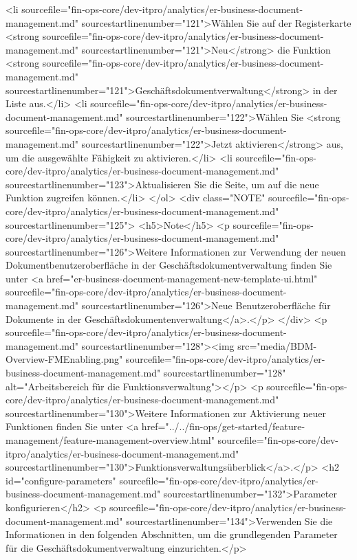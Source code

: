 <li sourcefile="fin-ops-core/dev-itpro/analytics/er-business-document-management.md" sourcestartlinenumber="121">Wählen Sie auf der Registerkarte <strong sourcefile="fin-ops-core/dev-itpro/analytics/er-business-document-management.md" sourcestartlinenumber="121">Neu</strong> die Funktion <strong sourcefile="fin-ops-core/dev-itpro/analytics/er-business-document-management.md" sourcestartlinenumber="121">Geschäftsdokumentverwaltung</strong> in der Liste aus.</li>
<li sourcefile="fin-ops-core/dev-itpro/analytics/er-business-document-management.md" sourcestartlinenumber="122">Wählen Sie <strong sourcefile="fin-ops-core/dev-itpro/analytics/er-business-document-management.md" sourcestartlinenumber="122">Jetzt aktivieren</strong> aus, um die ausgewählte Fähigkeit zu aktivieren.</li>
<li sourcefile="fin-ops-core/dev-itpro/analytics/er-business-document-management.md" sourcestartlinenumber="123">Aktualisieren Sie die Seite, um auf die neue Funktion zugreifen können.</li>
</ol>
<div class="NOTE" sourcefile="fin-ops-core/dev-itpro/analytics/er-business-document-management.md" sourcestartlinenumber="125">
<h5>Note</h5>
<p sourcefile="fin-ops-core/dev-itpro/analytics/er-business-document-management.md" sourcestartlinenumber="126">Weitere Informationen zur Verwendung der neuen Dokumentbenutzeroberfläche in der Geschäftsdokumentverwaltung finden Sie unter <a href="er-business-document-management-new-template-ui.html" sourcefile="fin-ops-core/dev-itpro/analytics/er-business-document-management.md" sourcestartlinenumber="126">Neue Benutzeroberfläche für Dokumente in der Geschäftsdokumentenverwaltung</a>.</p>
</div>
<p sourcefile="fin-ops-core/dev-itpro/analytics/er-business-document-management.md" sourcestartlinenumber="128"><img src="media/BDM-Overview-FMEnabling.png" sourcefile="fin-ops-core/dev-itpro/analytics/er-business-document-management.md" sourcestartlinenumber="128" alt="Arbeitsbereich für die Funktionsverwaltung"></p>
<p sourcefile="fin-ops-core/dev-itpro/analytics/er-business-document-management.md" sourcestartlinenumber="130">Weitere Informationen zur Aktivierung neuer Funktionen finden Sie unter <a href="../../fin-ops/get-started/feature-management/feature-management-overview.html" sourcefile="fin-ops-core/dev-itpro/analytics/er-business-document-management.md" sourcestartlinenumber="130">Funktionsverwaltungsüberblick</a>.</p>
<h2 id="configure-parameters" sourcefile="fin-ops-core/dev-itpro/analytics/er-business-document-management.md" sourcestartlinenumber="132">Parameter konfigurieren</h2>
<p sourcefile="fin-ops-core/dev-itpro/analytics/er-business-document-management.md" sourcestartlinenumber="134">Verwenden Sie die Informationen in den folgenden Abschnitten, um die grundlegenden Parameter für die Geschäftsdokumentverwaltung einzurichten.</p>
